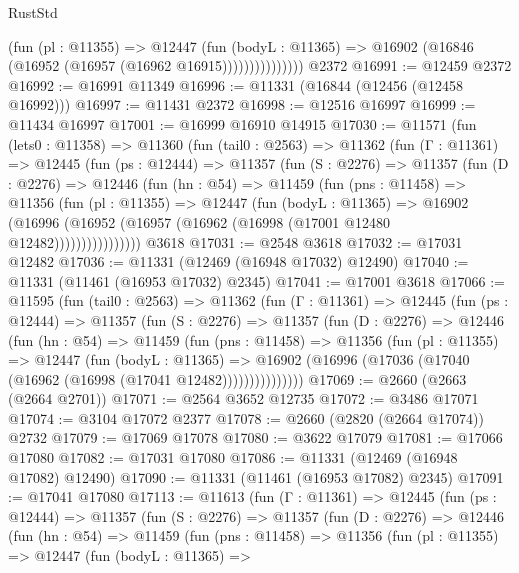 \begin{lexlean}{RustStd}
\begin{coremodule}
                      (fun (pl : @11355) =>
                      @12447
                        (fun (bodyL : @11365) =>
                        @16902 (@16846 (@16952 (@16957 (@16962 @16915)))))))))))))))
    @2372
@16991 := @12459 @2372
@16992 := @16991 @11349
@16996 := @11331 (@16844 (@12456 (@12458 @16992)))
@16997 := @11431 @2372
@16998 := @12516 @16997
@16999 := @11434 @16997
@17001 := @16999 @16910 @14915
@17030 := @11571
    (fun (lets0 : @11358) =>
    @11360
      (fun (tail0 : @2563) =>
      @11362
        (fun (Γ : @11361) =>
        @12445
          (fun (ps : @12444) =>
          @11357
            (fun (S : @2276) =>
            @11357
              (fun (D : @2276) =>
              @12446
                (fun (hn : @54) =>
                @11459
                  (fun (pns : @11458) =>
                  @11356
                    (fun (pl : @11355) =>
                    @12447
                      (fun (bodyL : @11365) =>
                      @16902
                        (@16996
                          (@16952 (@16957 (@16962 (@16998 (@17001 @12480 @12482))))))))))))))))
    @3618
@17031 := @2548 @3618
@17032 := @17031 @12482
@17036 := @11331 (@12469 (@16948 @17032) @12490)
@17040 := @11331 (@11461 (@16953 @17032) @2345)
@17041 := @17001 @3618
@17066 := @11595
    (fun (tail0 : @2563) =>
    @11362
      (fun (Γ : @11361) =>
      @12445
        (fun (ps : @12444) =>
        @11357
          (fun (S : @2276) =>
          @11357
            (fun (D : @2276) =>
            @12446
              (fun (hn : @54) =>
              @11459
                (fun (pns : @11458) =>
                @11356
                  (fun (pl : @11355) =>
                  @12447
                    (fun (bodyL : @11365) =>
                    @16902 (@16996 (@17036 (@17040 (@16962 (@16998 (@17041 @12482)))))))))))))))
@17069 := @2660 (@2663 (@2664 @2701))
@17071 := @2564 @3652 @12735
@17072 := @3486 @17071
@17074 := @3104 @17072 @2377
@17078 := @2660 (@2820 (@2664 @17074)) @2732
@17079 := @17069 @17078
@17080 := @3622 @17079
@17081 := @17066 @17080
@17082 := @17031 @17080
@17086 := @11331 (@12469 (@16948 @17082) @12490)
@17090 := @11331 (@11461 (@16953 @17082) @2345)
@17091 := @17041 @17080
@17113 := @11613
    (fun (Γ : @11361) =>
    @12445
      (fun (ps : @12444) =>
      @11357
        (fun (S : @2276) =>
        @11357
          (fun (D : @2276) =>
          @12446
            (fun (hn : @54) =>
            @11459
              (fun (pns : @11458) =>
              @11356
                (fun (pl : @11355) =>
                @12447
                  (fun (bodyL : @11365) =>

\end{coremodule}
\end{lexlean}
